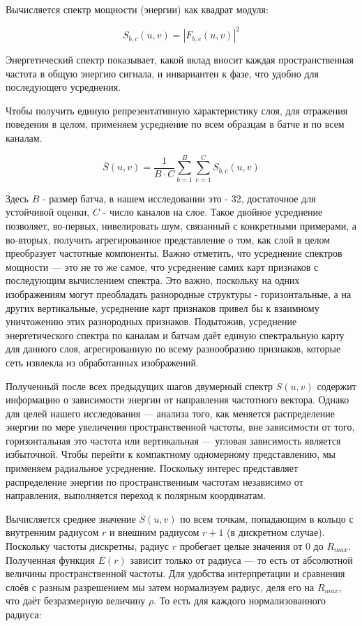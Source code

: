Вычисляется спектр мощности (энергии) как квадрат модуля:

\begin{equation}
    S_{b,c}(u, v) = |F_{b,c}(u, v)|^2
\end{equation}

Энергетический спектр показывает, какой вклад вносит каждая пространственная частота в общую энергию сигнала, и инвариантен к фазе, что удобно для последующего усреднения.

Чтобы получить единую репрезентативную характеристику слоя, для отражения поведения в целом, применяем усреднение по всем образцам в батче и по всем каналам.

\begin{equation}
    \bar{S}(u, v) = \frac{1}{B \cdot C} \sum_{b=1}^{B} \sum_{c=1}^{C} S_{b,c}(u, v)
\end{equation}

Здесь $B$ - размер батча, в нашем исследовании это - 32, достаточное для устойчивой оценки, $C$ - число каналов на слое. Такое двойное усреднение позволяет, во-первых, нивелировать шум, связанный с конкретными примерами, а во-вторых, получить агрегированное представление о том, как слой в целом преобразует частотные компоненты. Важно отметить, что усреднение спектров мощности — это не то же самое, что усреднение самих карт признаков с последующим вычислением спектра. Это важно, поскольку на одних изображениям могут преобладать разнородные структуры - горизонтальные, а на других вертикальные, усреднение карт признаков привел бы к взаимному уничтожению этих разнородных признаков. 
Подытожив, усреднение энергетического спектра по каналам и батчам даёт единую спектральную карту для данного слоя, агрегированную по всему разнообразию признаков, которые сеть извлекла из обработанных изображений. 

Полученный после всех предыдущих шагов двумерный спектр $S(u,v)$ содержит информацию о зависимости энергии от направления частотного вектора. Однако для целей нашего исследования — анализа того, как меняется распределение энергии по мере увеличения пространственной частоты, вне зависимости от того, горизонтальная это частота или вертикальная — угловая зависимость является избыточной. Чтобы перейти к компактному одномерному представлению, мы применяем радиальное усреднение. Поскольку интерес представляет распределение энергии по пространственным частотам независимо от направления, выполняется переход к полярным координатам. 

Вычисляется среднее значение $\bar S(u,v)$ по всем точкам, попадающим в кольцо с внутренним радиусом $r$ и внешним радиусом $r+1$ (в дискретном случае). Поскольку частоты дискретны, радиус $r$ пробегает целые значения от $0$ до $R_{max}$. 
Полученная функция $E(r)$ зависит только от радиуса — то есть от абсолютной величины пространственной частоты. Для удобства интерпретации и сравнения слоёв с разным разрешением мы затем нормализуем радиус, деля его на $R_{max}$, что даёт безразмерную величину $\rho$. То есть для каждого нормализованного радиуса:

